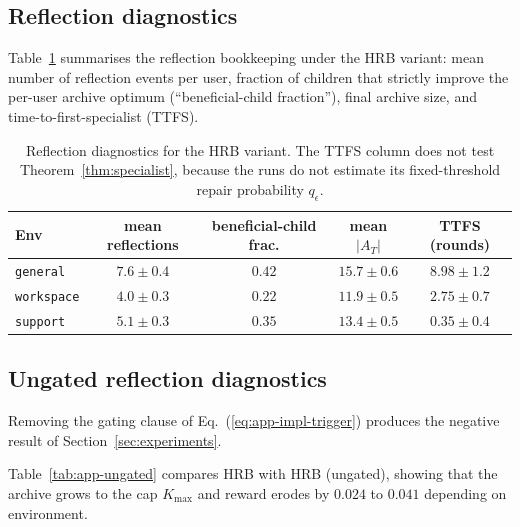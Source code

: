\documentclass{article} %
\renewcommand{\eqref}[1]{\textup{(\ref{#1})}}
\begin{document}
\subsection{Reflection diagnostics}

\label{app:tab-refl}

Table~\ref{tab:app-reflection} summarises the reflection bookkeeping under the \textnormal{HRB} variant: mean number of reflection events per user, fraction of children that strictly improve the per-user archive optimum (``beneficial-child fraction''), final archive size, and time-to-first-specialist (TTFS).

\begin{table}[h]
\centering
\small
\begin{tabular}{lcccc}
\toprule
Env & mean reflections & beneficial-child frac. & mean $|A_T|$ & TTFS (rounds) \\
\midrule
\texttt{general}   & $7.6 \pm 0.4$ & $0.42$ & $15.7 \pm 0.6$ & $8.98 \pm 1.2$ \\
\texttt{workspace} & $4.0 \pm 0.3$ & $0.22$ & $11.9 \pm 0.5$ & $2.75 \pm 0.7$ \\
\texttt{support}   & $5.1 \pm 0.3$ & $0.35$ & $13.4 \pm 0.5$ & $0.35 \pm 0.4$ \\
\bottomrule
\end{tabular}
\caption{Reflection diagnostics for the \textnormal{HRB} variant. The TTFS column
does not test Theorem~\ref{thm:specialist}, because the runs do not estimate its
fixed-threshold repair probability \(q_\epsilon\).}
\label{tab:app-reflection}
\end{table}

\subsection{Ungated reflection diagnostics}

\label{app:tab-ungated}

Removing the gating clause of Eq.~\eqref{eq:app-impl-trigger} produces the
negative result of Section~\ref{sec:experiments}.

Table~\ref{tab:app-ungated} compares HRB with HRB (ungated), showing that the archive grows to the cap $K_{\max}$ and reward erodes by $0.024$ to $0.041$ depending on environment.
\end{document}
